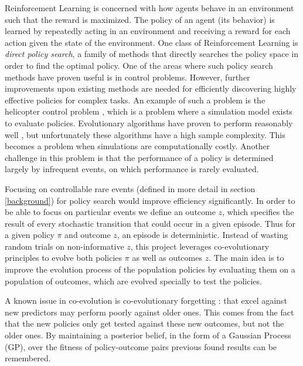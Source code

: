 Reinforcement Learning is concerned with how agents behave in an environment such that the reward is maximized. The policy of an agent (its behavior) is learned by repeatedly acting in an environment and receiving a reward for each action given the state of the environment. One class of Reinforcement Learning is \textit{direct policy search}, a family of methods that directly searches the policy space in order to find the optimal policy. One of the areas where such policy search methods have proven useful is in control problems. However, further improvements upon existing methods are needed for efficiently discovering highly effective policies for complex tasks. An example of such a problem is the helicopter control problem \cite{abbeel2007application}, which is a problem where a simulation model exists to evaluate policies. Evolutionary algorithms have proven to perform reasonably well \cite{koppejan2011neuroevolutionary}, but unfortunately these algorithms have a high sample complexity. This becomes a problem when simulations are computationally costly. Another challenge in this problem is that the performance of a policy is determined largely by infrequent events, on which performance is rarely evaluated.

Focusing on controllable rare events (defined in more detail in section \ref{background}) for policy search would improve efficiency significantly. In order to be able to focus on particular events we define an outcome $z$, which specifies the result of every stochastic transition that could occur in a given episode. Thus for a given policy $\pi$ and outcome $z$, an episode is deterministic. Instead of wasting random trials on non-informative $z$, this project leverages co-evolutionary principles to evolve both policies $\pi$ as well as outcomes $z$. The main idea is to improve the evolution process of the population policies by evaluating them on a population of outcomes, which are evolved specially to test the policies.

A known issue in co-evolution is co-evolutionary forgetting \cite{ficici2003game}: that excel against new predictors may perform poorly against older ones. This comes from the fact that the new policies only get tested against these new outcomes, but not the older ones. By maintaining a posterior belief, in the form of a Gaussian Process (GP), over the fitness of policy-outcome pairs previous found results can be remembered. 

